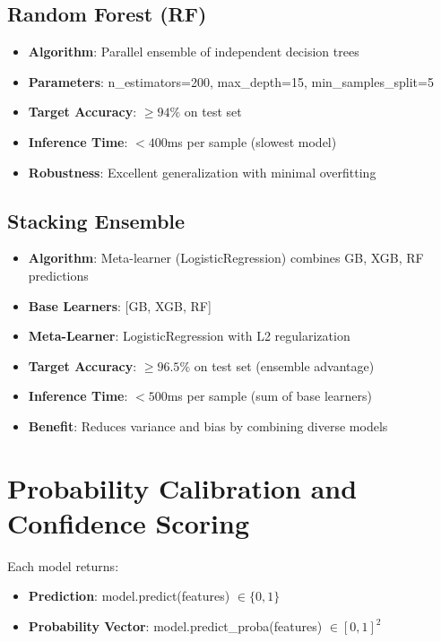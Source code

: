\documentclass[12pt,a4paper]{report}
\begin{document}
\subsection{Random Forest (RF)}
\begin{itemize}[leftmargin=*]
    \item \textbf{Algorithm}: Parallel ensemble of independent decision trees
    \item \textbf{Parameters}: n\_estimators=200, max\_depth=15, min\_samples\_split=5
    \item \textbf{Target Accuracy}: $\geq 94\%$ on test set
    \item \textbf{Inference Time}: $<400$ms per sample (slowest model)
    \item \textbf{Robustness}: Excellent generalization with minimal overfitting
\end{itemize}

\subsection{Stacking Ensemble}
\begin{itemize}[leftmargin=*]
    \item \textbf{Algorithm}: Meta-learner (LogisticRegression) combines GB, XGB, RF predictions
    \item \textbf{Base Learners}: [GB, XGB, RF]
    \item \textbf{Meta-Learner}: LogisticRegression with L2 regularization
    \item \textbf{Target Accuracy}: $\geq 96.5\%$ on test set (ensemble advantage)
    \item \textbf{Inference Time}: $<500$ms per sample (sum of base learners)
    \item \textbf{Benefit}: Reduces variance and bias by combining diverse models
\end{itemize}

\section{Probability Calibration and Confidence Scoring}

Each model returns:
\begin{itemize}[leftmargin=*]
    \item \textbf{Prediction}: model.predict(features) $\in \{0, 1\}$
    \item \textbf{Probability Vector}: model.predict\_proba(features) $\in [0, 1]^2$
\end{itemize}
\end{document}
